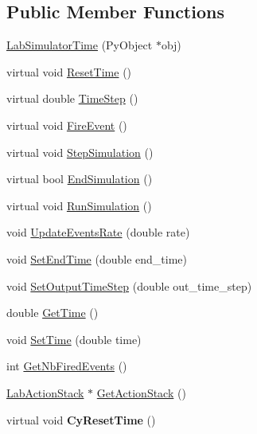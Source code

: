 \subsection*{Public Member Functions}
\begin{DoxyCompactItemize}
\item 
\hyperlink{classelps_1_1_lab_simulator_time_aad60019cdc234343d6577da6476cd30b}{Lab\+Simulator\+Time} (Py\+Object $\ast$obj)
\item 
virtual void \hyperlink{classelps_1_1_lab_simulator_time_ad2f79a788d88d06558e17ce65a89f769}{Reset\+Time} ()
\item 
virtual double \hyperlink{classelps_1_1_lab_simulator_time_a5f3478468090fe5d741759a8806a6abf}{Time\+Step} ()
\item 
virtual void \hyperlink{classelps_1_1_lab_simulator_time_a6ed55e9c17248459dfa5c6ab9caee7f5}{Fire\+Event} ()
\item 
virtual void \hyperlink{classelps_1_1_lab_simulator_time_ad8845591018d7d9bdf38932faa2a04dd}{Step\+Simulation} ()
\item 
virtual bool \hyperlink{classelps_1_1_lab_simulator_time_ada8cfaa732adce02ebe8d8f59d758257}{End\+Simulation} ()
\item 
virtual void \hyperlink{classelps_1_1_lab_simulator_time_a9cf1c9a315d192ea8c065389788fd2c5}{Run\+Simulation} ()
\item 
void \hyperlink{classelps_1_1_lab_simulator_time_a94fe296103f640da61eb7004e9aff4db}{Update\+Events\+Rate} (double rate)
\item 
void \hyperlink{classelps_1_1_lab_simulator_time_ac81be5ce1858737388fc1095aac55bdd}{Set\+End\+Time} (double end\+\_\+time)
\item 
void \hyperlink{classelps_1_1_lab_simulator_time_add746d0dc50b20d56268d1dd5bba55b1}{Set\+Output\+Time\+Step} (double out\+\_\+time\+\_\+step)
\item 
double \hyperlink{classelps_1_1_lab_simulator_time_a3067e525a7e1c65e47d40860b62efa03}{Get\+Time} ()
\item 
void \hyperlink{classelps_1_1_lab_simulator_time_a7c560295a90fa0c484f7f9f9342de45b}{Set\+Time} (double time)
\item 
int \hyperlink{classelps_1_1_lab_simulator_time_a5935ef5c9274a0954cd8682b755f26aa}{Get\+Nb\+Fired\+Events} ()
\item 
\hyperlink{classelps_1_1_lab_action_stack}{Lab\+Action\+Stack} $\ast$ \hyperlink{classelps_1_1_lab_simulator_time_a3117d74712b8323129c0179b9b3ab3e3}{Get\+Action\+Stack} ()
\item 
\hypertarget{classelps_1_1_lab_simulator_time_a56c5c0bcdfbf7ed3ae3fda1cbc14cb48}{virtual void {\bfseries Cy\+Reset\+Time} ()}\label{classelps_1_1_lab_simulator_time_a56c5c0bcdfbf7ed3ae3fda1cbc14cb48}


\end{DoxyCompactItemize}
